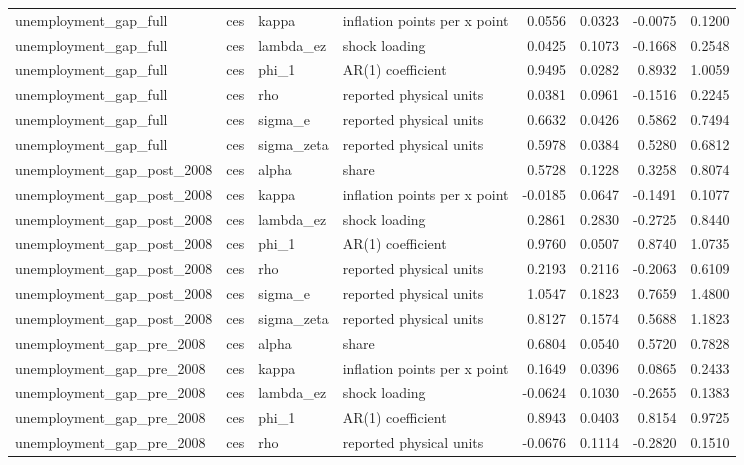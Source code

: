 \begin{tabular}{llllrrrr}
unemployment\_gap\_full & ces & kappa & inflation points per x point & 0.0556 & 0.0323 & -0.0075 & 0.1200 \\
unemployment\_gap\_full & ces & lambda\_ez & shock loading & 0.0425 & 0.1073 & -0.1668 & 0.2548 \\
unemployment\_gap\_full & ces & phi\_1 & AR(1) coefficient & 0.9495 & 0.0282 & 0.8932 & 1.0059 \\
unemployment\_gap\_full & ces & rho & reported physical units & 0.0381 & 0.0961 & -0.1516 & 0.2245 \\
unemployment\_gap\_full & ces & sigma\_e & reported physical units & 0.6632 & 0.0426 & 0.5862 & 0.7494 \\
unemployment\_gap\_full & ces & sigma\_zeta & reported physical units & 0.5978 & 0.0384 & 0.5280 & 0.6812 \\
unemployment\_gap\_post\_2008 & ces & alpha & share & 0.5728 & 0.1228 & 0.3258 & 0.8074 \\
unemployment\_gap\_post\_2008 & ces & kappa & inflation points per x point & -0.0185 & 0.0647 & -0.1491 & 0.1077 \\
unemployment\_gap\_post\_2008 & ces & lambda\_ez & shock loading & 0.2861 & 0.2830 & -0.2725 & 0.8440 \\
unemployment\_gap\_post\_2008 & ces & phi\_1 & AR(1) coefficient & 0.9760 & 0.0507 & 0.8740 & 1.0735 \\
unemployment\_gap\_post\_2008 & ces & rho & reported physical units & 0.2193 & 0.2116 & -0.2063 & 0.6109 \\
unemployment\_gap\_post\_2008 & ces & sigma\_e & reported physical units & 1.0547 & 0.1823 & 0.7659 & 1.4800 \\
unemployment\_gap\_post\_2008 & ces & sigma\_zeta & reported physical units & 0.8127 & 0.1574 & 0.5688 & 1.1823 \\
unemployment\_gap\_pre\_2008 & ces & alpha & share & 0.6804 & 0.0540 & 0.5720 & 0.7828 \\
unemployment\_gap\_pre\_2008 & ces & kappa & inflation points per x point & 0.1649 & 0.0396 & 0.0865 & 0.2433 \\
unemployment\_gap\_pre\_2008 & ces & lambda\_ez & shock loading & -0.0624 & 0.1030 & -0.2655 & 0.1383 \\
unemployment\_gap\_pre\_2008 & ces & phi\_1 & AR(1) coefficient & 0.8943 & 0.0403 & 0.8154 & 0.9725 \\
unemployment\_gap\_pre\_2008 & ces & rho & reported physical units & -0.0676 & 0.1114 & -0.2820 & 0.1510 \\

\end{tabular}
